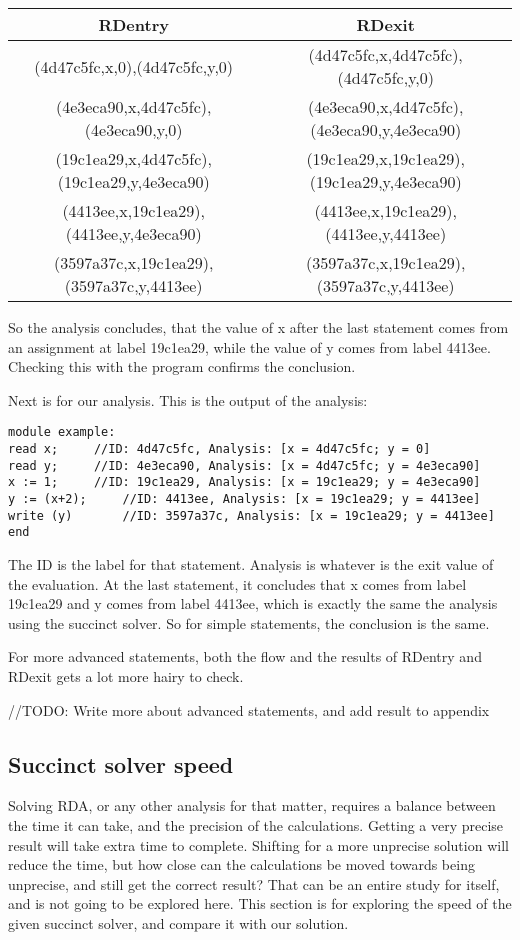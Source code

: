 \begin{center}
	\begin{tabular}{ | c | c | }
		\hline
		RDentry & RDexit \\
		\hline
		\hline
		(4d47c5fc,x,0),(4d47c5fc,y,0) & (4d47c5fc,x,4d47c5fc),(4d47c5fc,y,0) \\
		(4e3eca90,x,4d47c5fc),(4e3eca90,y,0) & (4e3eca90,x,4d47c5fc),(4e3eca90,y,4e3eca90) \\
		(19c1ea29,x,4d47c5fc),(19c1ea29,y,4e3eca90) & (19c1ea29,x,19c1ea29),(19c1ea29,y,4e3eca90) \\
		(4413ee,x,19c1ea29),(4413ee,y,4e3eca90) & (4413ee,x,19c1ea29),(4413ee,y,4413ee) \\
		(3597a37c,x,19c1ea29),(3597a37c,y,4413ee) & (3597a37c,x,19c1ea29),(3597a37c,y,4413ee) \\
		\hline
	\end{tabular}
\end{center}

So the analysis concludes, that the value of x after the last statement comes from an assignment at label 19c1ea29, while the value of y comes from label 4413ee. Checking this with the program confirms the conclusion.

Next is for our analysis. This is the output of the analysis:

\begin{lstlisting}
module example:
read x;		//ID: 4d47c5fc, Analysis: [x = 4d47c5fc; y = 0]
read y;		//ID: 4e3eca90, Analysis: [x = 4d47c5fc; y = 4e3eca90]
x := 1;		//ID: 19c1ea29, Analysis: [x = 19c1ea29; y = 4e3eca90]
y := (x+2);		//ID: 4413ee, Analysis: [x = 19c1ea29; y = 4413ee]
write (y)		//ID: 3597a37c, Analysis: [x = 19c1ea29; y = 4413ee]
end
\end{lstlisting}

The ID is the label for that statement. Analysis is whatever is the exit value of the evaluation. At the last statement, it concludes that x comes from label 19c1ea29 and y comes from label 4413ee, which is exactly the same the analysis using the succinct solver. So for simple statements, the conclusion is the same.

For more advanced statements, both the flow and the results of RDentry and RDexit gets a lot more hairy to check.

//TODO: Write more about advanced statements, and add result to appendix

\subsection{Succinct solver speed}
Solving RDA, or any other analysis for that matter, requires a balance between the time it can take, and the precision of the calculations. Getting a very precise result will take extra time to complete. Shifting for a more unprecise solution will reduce the time, but how close can the calculations be moved towards being unprecise, and still get the correct result? That can be an entire study for itself, and is not going to be explored here. This section is for exploring the speed of the given succinct solver, and compare it with our solution.

